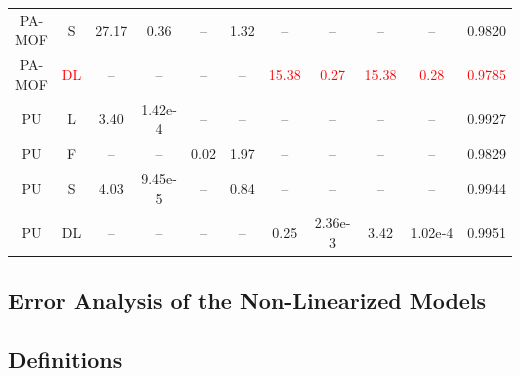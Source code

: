 \documentclass[journal=jacsat,manuscript=article]{achemso}
\begin{document}
\begin{table}[H]
\begin{tabular}{c | c | c c | c c | c c c c | c}
		\rowcolor{lime!25} PA-MOF  & S               & 27.17      & 0.36  & –      & 1.32  & –            & –      & –            & –         & 0.9820  \\
		PA-MOF  & \textcolor{red}{DL}    & –          & –     & –      & –     & \textcolor{red}{15.38}        & \textcolor{red}{0.27}   & \textcolor{red}{15.38}        & \textcolor{red}{0.28}      & \textcolor{red}{0.9785}  \\
		\hline
		PU     & L           &  3.40      & 1.42e-4  & –      & –     & –            & –      & –            & –         & 0.9927  \\
		PU     & F         & –          & –     & 0.02   & 1.97  & –            & –      & –            & –         & 0.9829  \\
		PU     & S               &  4.03      & 9.45e-5  & –      & 0.84  & –            & –      & –            & –         & 0.9944  \\
		\rowcolor{lime!25} PU     & DL    & –          & –     & –      & –     & 0.25         & 2.36e-3   & 3.42         & 1.02e‑4    & 0.9951  \\
		\hline
	\end{tabular}
\end{table}     
  

\subsection{Error Analysis of the Non-Linearized Models} \label{section:Error_analysis}

\subsection{Definitions}
\end{document}

